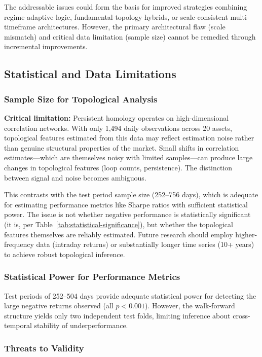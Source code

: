 The addressable issues could form the basis for improved strategies combining regime-adaptive logic, fundamental-topology hybrids, or scale-consistent multi-timeframe architectures. However, the primary architectural flaw (scale mismatch) and critical data limitation (sample size) cannot be remedied through incremental improvements.

\subsection{Statistical and Data Limitations}

\subsubsection{Sample Size for Topological Analysis}

\textbf{Critical limitation:} Persistent homology operates on high-dimensional correlation networks. With only 1,494 daily observations across 20 assets, topological features estimated from this data may reflect estimation noise rather than genuine structural properties of the market. Small shifts in correlation estimates---which are themselves noisy with limited samples---can produce large changes in topological features (loop counts, persistence). The distinction between signal and noise becomes ambiguous.

This contrasts with the test period sample size (252--756 days), which is adequate for estimating performance metrics like Sharpe ratios with sufficient statistical power. The issue is not whether negative performance is statistically significant (it is, per Table~\ref{tab:statistical-significance}), but whether the topological features themselves are reliably estimated. Future research should employ higher-frequency data (intraday returns) or substantially longer time series (10+ years) to achieve robust topological inference.

\subsubsection{Statistical Power for Performance Metrics}

Test periods of 252--504 days provide adequate statistical power for detecting the large negative returns observed (all $p < 0.001$). However, the walk-forward structure yields only two independent test folds, limiting inference about cross-temporal stability of underperformance.

\subsubsection{Threats to Validity}

